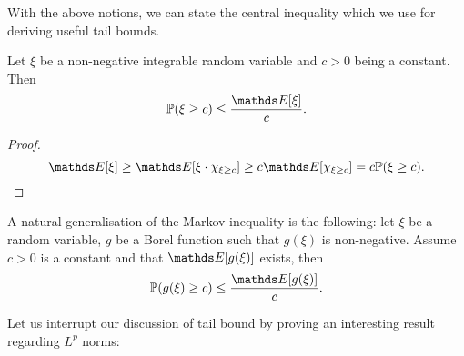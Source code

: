 
With the above notions, we can state the central inequality which we use for deriving useful tail bounds.

\begin{theorem}
Let $\xi$ be a non-negative integrable random variable and $c>0$ being a constant. Then
\begin{equation}
    \p(\xi \ge c) \le \frac{\E[\xi]}{c}.
\end{equation}
\end{theorem}

\begin{proof}
\begin{equation*}
    \E[\xi] \ge \E[\xi \cdot \chi_{\xi \ge c}] \ge c \E[\chi_{\xi \ge c}] = c \p(\xi \ge c).
\end{equation*}
\end{proof}

\begin{remark} A natural generalisation of the Markov inequality is the following: let $\xi$ be a random variable, $g$ be a Borel function such that $g(\xi)$ is non-negative. Assume $c>0$ is a constant and that $\E[g(\xi)]$ exists, then
\begin{equation} \label{eq:Markov}
    \p(g(\xi) \ge c) \le \frac{\E[g(\xi)]}{c}.
\end{equation}
\end{remark}

Let us interrupt our discussion of tail bound by proving an interesting result regarding $L^p$ norms:

